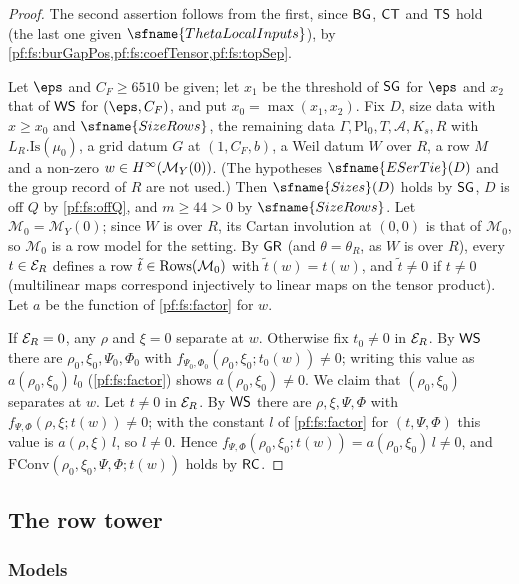 \begin{proof}
The second assertion follows from the first, since $\mathsf{BG}$, $\mathsf{CT}$ and $\mathsf{TS}$ hold (the last one given
$\sfname{ThetaLocalInputs}$), by \cref{pf:fs:burGapPos,pf:fs:coefTensor,pf:fs:topSep}.

Let $\eps$ and $C_F\ge6510$ be given; let $x_1$ be the threshold of $\mathsf{SG}$ for $\eps$ and $x_2$ that of $\mathsf{WS}$ for
$(\eps,C_F)$, and put $x_0=\max(x_1,x_2)$. Fix $D$, size data with $x\ge x_0$ and $\sfname{SizeRows}$, the remaining data
$\Gamma,\mathrm{Pl}_0,T,\mathcal A,K_s,R$ with $L_R.\mathrm{Is}(\mu_0)$, a grid datum $G$ at $(1,C_F,b)$, a Weil datum $W$ over $R$, a row
$M$ and a non-zero $w\in H^{\infty}(\mathcal M_Y(0))$. (The hypotheses $\sfname{ESerTie}(D)$ and the group record of $R$ are not used.)
Then $\sfname{Sizes}(D)$ holds by $\mathsf{SG}$, $D$ is off $Q$ by \cref{pf:fs:offQ}, and $m\ge44>0$ by $\sfname{SizeRows}$. Let
$\mathcal M_0=\mathcal M_Y(0)$; since $W$ is over $R$, its Cartan involution at $(0,0)$ is that of $\mathcal M_0$, so $\mathcal M_0$ is a
row model for the setting. By $\mathsf{GR}$ (and $\theta=\theta_R$, as $W$ is over $R$), every $t\in\mathcal E_R$ defines a row
$\tilde t\in\mathrm{Rows}(\mathcal M_0)$ with $\tilde t(w)=t(w)$, and $\tilde t\ne0$ if $t\ne0$ (multilinear maps correspond injectively to
linear maps on the tensor product). Let $a$ be the function of \cref{pf:fs:factor} for $w$.

If $\mathcal E_R=0$, any $\rho$ and $\xi=0$ separate at $w$. Otherwise fix $t_0\ne0$ in $\mathcal E_R$. By $\mathsf{WS}$ there are
$\rho_0,\xi_0,\Psi_0,\Phi_0$ with $f_{\Psi_0,\Phi_0}(\rho_0,\xi_0;t_0(w))\ne0$; writing this value as $a(\rho_0,\xi_0)\,l_0$
(\cref{pf:fs:factor}) shows $a(\rho_0,\xi_0)\ne0$. We claim that $(\rho_0,\xi_0)$ separates at $w$. Let $t\ne0$ in $\mathcal E_R$. By
$\mathsf{WS}$ there are $\rho,\xi,\Psi,\Phi$ with $f_{\Psi,\Phi}(\rho,\xi;t(w))\ne0$; with the constant $l$ of \cref{pf:fs:factor} for
$(t,\Psi,\Phi)$ this value is $a(\rho,\xi)\,l$, so $l\ne0$. Hence
$f_{\Psi,\Phi}(\rho_0,\xi_0;t(w))=a(\rho_0,\xi_0)\,l\neq0$, and $\mathrm{FConv}(\rho_0,\xi_0,\Psi,\Phi;t(w))$ holds by $\mathsf{RC}$.
\end{proof}

\subsection{The row tower}\label{sec:pf:fs:tower}

\subsubsection{Models}

